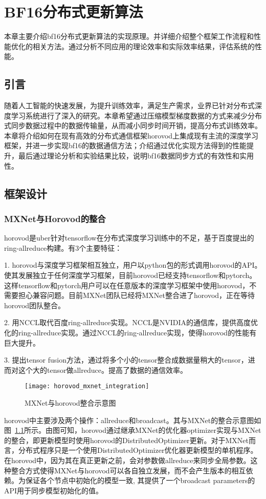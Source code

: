 \chapter{BF16分布式更新算法}
本章主要介绍bf16分布式更新算法的实现原理。并详细介绍整个框架工作流程和性能优化的相关方法。通过分析不同应用的理论效率和实际效率结果，评估系统的性能。
\section{引言}
随着人工智能的快速发展，为提升训练效率，满足生产需求，业界已针对分布式深度学习系统进行了深入的研究。本章希望通过压缩模型梯度数据的方式来减少分布式同步数据过程中的数据传输量，从而减小同步时间开销，提高分布式训练效率。本章将介绍如何在现有高效的分布式通信框架horovod上集成现有主流的深度学习框架，并进一步实现bf16的数据通信方法；介绍通过优化实现方法得到的性能提升，最后通过理论分析和实验结果比较，说明bf16数据同步方式的有效性和实用性。
\section{框架设计}
\subsection{MXNet与Horovod的整合}
horovod是uber针对tensorflow在分布式深度学习训练中的不足，基于百度提出的ring-allreduce构建。有3个主要特征：

1. horovod与深度学习框架相互独立，用户以python包的形式调用horovod的API。使其发展独立于任何深度学习框架，目前horovod已经支持tensorflow和pytorch。这样tensorflow和pytorch用户可以在任意版本的深度学习框架中使用horovod，不需要担心兼容问题。目前MXNet团队已经将MXNet整合进了horovod，正在等待horovod团队整合。

2. 用NCCL取代百度ring-allreduce实现。NCCL是NVIDIA的通信库，提供高度优化的ring-allreduce实现。通过NCCL的ring-allreduce实现，使得horovod的性能有巨大提升。

3. 提出tensor fusion方法，通过将多个小的tensor整合成数据量稍大的tensor，进而对这个大的tensor做allreduce。提高了数据的通信效率。

\begin{figure}[htp]
\centering
\texttt{[image: horovod\_mxnet\_integration]}
\caption{MXNet与horovod整合示意图}
\label{fig:horovod_mxnet_integration}
\end{figure}
horovod中主要涉及两个操作：allreduce和broadcast。其与MXNet的整合示意图如图~\ref{fig:horovod_mxnet_integration}所示。由图可知，horovod通过继承MXNet的优化器optimizer实现与MXNet的整合，即更新模型时使用horovod的DistributedOptimizer更新。对于MXNet而言，分布式程序只是一个使用DistributedOptimizer优化器更新模型的单机程序。在horovod中，因为其在真正更新之前，会对参数做allreduce来同步全局参数。这种整合方式使得MXNet与horovod可以各自独立发展，而不会产生版本的相互依赖。为保证各个节点中初始化的模型一致, 其提供了一个broadcast parameters的API用于同步模型初始化的值。

